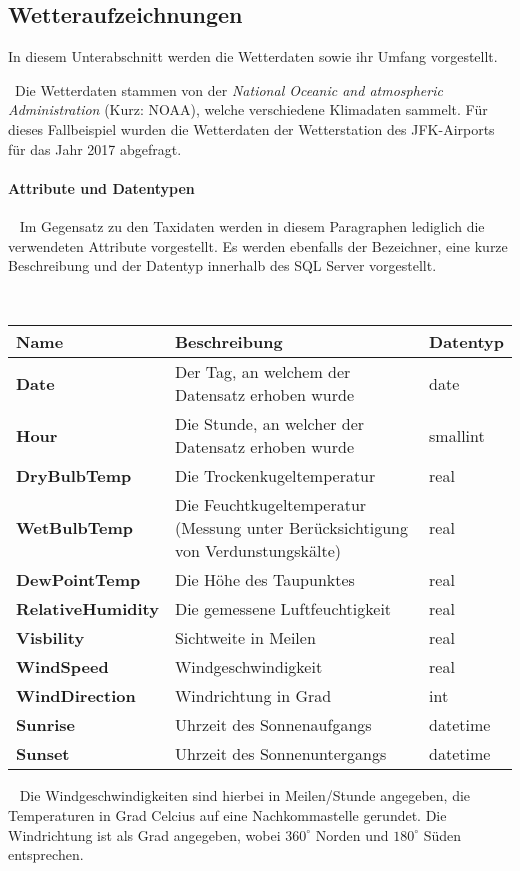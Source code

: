 \subsection{Wetteraufzeichnungen}
\label{subsec:Wetterdaten}
In diesem Unterabschnitt werden die Wetterdaten sowie ihr Umfang vorgestellt. 

~\newline Die Wetterdaten stammen von der \textit{National Oceanic and atmospheric Administration} \cite{SourceWeather} (Kurz: NOAA), welche verschiedene Klimadaten sammelt. Für dieses Fallbeispiel wurden die Wetterdaten der Wetterstation des JFK-Airports für das Jahr 2017 abgefragt. 

\paragraph{Attribute und Datentypen} ~\newline
Im Gegensatz zu den Taxidaten werden in diesem Paragraphen lediglich die verwendeten Attribute vorgestellt. Es werden ebenfalls der Bezeichner, eine kurze Beschreibung und der Datentyp innerhalb des SQL Server vorgestellt. 

~\newline
\begin{center}
	\begin{tabular}{|p{}|p{}|p{}|}
		\hline
		Name & Beschreibung & Datentyp  \\ \hline
		\textbf{Date} & Der Tag, an welchem der Datensatz erhoben wurde & date \\ \hline
		\textbf{Hour} & Die Stunde, an welcher der Datensatz erhoben wurde & smallint \\ \hline
		\textbf{DryBulbTemp} & Die Trockenkugeltemperatur & real \\ \hline
		\textbf{WetBulbTemp} & Die Feuchtkugeltemperatur (Messung unter Berücksichtigung von Verdunstungskälte) & real \\ \hline	
		\textbf{DewPointTemp} & Die Höhe des Taupunktes & real\\ \hline
		\textbf{RelativeHumidity} & Die gemessene Luftfeuchtigkeit & real \\ \hline 
		\textbf{Visbility} & Sichtweite in Meilen & real\\ \hline
		\textbf{WindSpeed} & Windgeschwindigkeit & real\\ \hline
		\textbf{WindDirection} & Windrichtung in Grad & int \\ \hline
		\textbf{Sunrise} & Uhrzeit des Sonnenaufgangs & datetime \\ \hline
		\textbf{Sunset} & Uhrzeit des Sonnenuntergangs & datetime \\ \hline
	\end{tabular}
\end{center}
~\newline
Die Windgeschwindigkeiten sind hierbei in Meilen/Stunde angegeben, die Temperaturen in Grad Celcius auf eine Nachkommastelle gerundet. Die Windrichtung ist als Grad angegeben, wobei $360^\circ$ Norden und $180^\circ $ Süden entsprechen.

